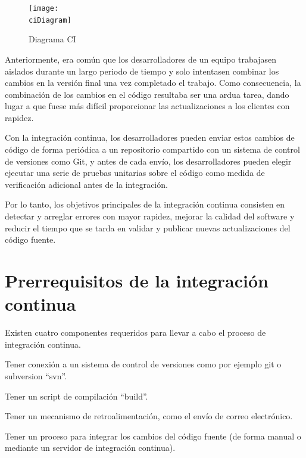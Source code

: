 \begin{figure}[h]
    \centering
    \texttt{[image: \\ciDiagram]}
    \caption{Diagrama CI \cite{CI_Paul_Duvall}}
\end{figure}

Anteriormente, era común que los desarrolladores de un equipo trabajasen aislados durante un largo periodo de tiempo y solo intentasen combinar los cambios en la versión final una vez completado el trabajo. Como consecuencia, la combinación de los cambios en el código resultaba ser una ardua tarea, dando lugar a que fuese más difícil proporcionar las actualizaciones a los clientes con rapidez.

Con la integración continua, los desarrolladores pueden enviar estos cambios de código de forma periódica a un repositorio compartido con un sistema de control de versiones como Git, y antes de cada envío, los desarrolladores pueden elegir ejecutar una serie de pruebas unitarias sobre el código como medida de verificación adicional antes de la integración.

Por lo tanto, los objetivos principales de la integración continua consisten en detectar y arreglar errores con mayor rapidez, mejorar la calidad del software y reducir el tiempo que se tarda en validar y publicar nuevas actualizaciones del código fuente.

\section{Prerrequisitos de la integración continua}
Existen cuatro componentes requeridos para llevar a cabo el proceso de integración continua.
\begin{compactitem}
    \item Tener conexión a un sistema de control de versiones como por ejemplo git o subversion ``svn''.
    \item Tener un script de compilación ``build''. 
    \item Tener un mecanismo de retroalimentación, como el envío de correo electrónico.
    \item Tener un proceso para integrar los cambios del código fuente (de forma manual o mediante un servidor de integración continua).
\end{compactitem}

